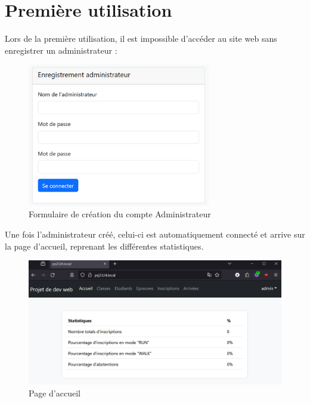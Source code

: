 \section{Première utilisation}

Lors de la première utilisation, il est impossible d'accéder au site web sans enregistrer un administrateur :

\begin{figure}[H]
	\centering
	\includegraphics[keepaspectratio,width=8cm]{images/Emploi1}
	\caption{Formulaire de création du compte Administrateur}
\end{figure}

Une fois l'administrateur créé, celui-ci est automatiquement connecté et arrive sur la page d'accueil, reprenant les différentes statistiques.

\begin{figure}[H]
	\centering
	\includegraphics[keepaspectratio,width=15cm]{images/Emploi2}
	\caption{Page d'accueil}
\end{figure}